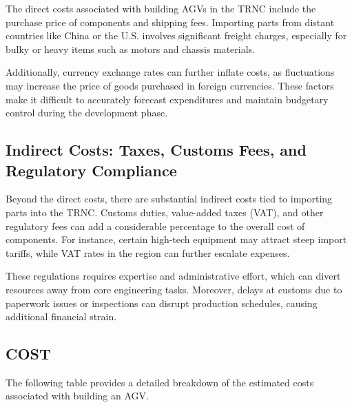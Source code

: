 \documentclass[../../main]{subfiles}
\begin{document}
The direct costs associated with building AGVs in the TRNC include the purchase price of components and shipping fees. 
Importing parts from distant countries like China or the U.S. involves significant freight charges, especially for bulky 
or heavy items such as motors and chassis materials. 

Additionally, currency exchange rates can further inflate costs, as fluctuations may increase the 
price of goods purchased in foreign currencies. These factors make it difficult to accurately 
forecast expenditures and maintain budgetary control during the development phase.

\subsection{Indirect Costs: Taxes, Customs Fees, and Regulatory Compliance}

Beyond the direct costs, there are substantial indirect costs tied to importing parts into the TRNC.
Customs duties, value-added taxes (VAT), and other regulatory fees can add a considerable percentage to 
the overall cost of components. For instance, certain high-tech equipment may attract steep import tariffs, 
while VAT rates in the region can further escalate expenses. 

These regulations requires expertise and administrative effort, 
which can divert resources away from core engineering tasks. Moreover, 
delays at customs due to paperwork issues or inspections can disrupt production schedules, 
causing additional financial strain.

\subsection{COST}
The following table provides a detailed breakdown of the estimated costs associated with building an AGV.
\end{document}
